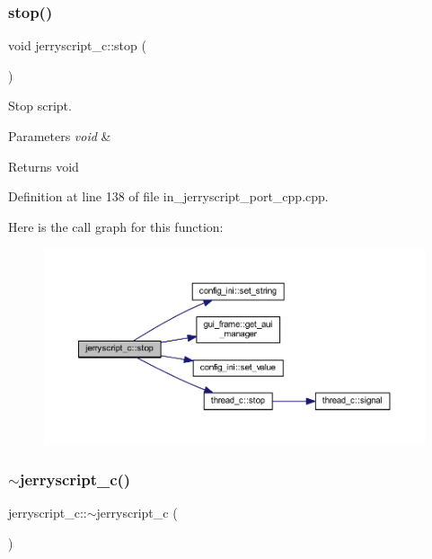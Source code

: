 \subsubsection{stop()}
{\footnotesize\ttfamily void jerryscript\+\_\+c\+::stop (\begin{DoxyParamCaption}\item[{void}]{ }\end{DoxyParamCaption})}



Stop script. 


\begin{DoxyParams}{Parameters}
{\em void} & \\
\hline
\end{DoxyParams}
\begin{DoxyReturn}{Returns}
void 
\end{DoxyReturn}


Definition at line 138 of file in\+\_\+jerryscript\+\_\+port\+\_\+cpp.\+cpp.

Here is the call graph for this function\+:
\nopagebreak
\begin{figure}[H]
\begin{center}
\leavevmode
\includegraphics[width=350pt]{group___port_gaca34fa1641ebe3ec63372dc6355f913c_cgraph}
\end{center}
\end{figure}
\mbox{\label{group___port_ga70bc4dccdb6382c8245155b6f09189e1}} 
\subsubsection{$\sim$jerryscript\_c()}
{\footnotesize\ttfamily jerryscript\+\_\+c\+::$\sim$jerryscript\+\_\+c (\begin{DoxyParamCaption}\item[{void}]{ }\end{DoxyParamCaption})}



